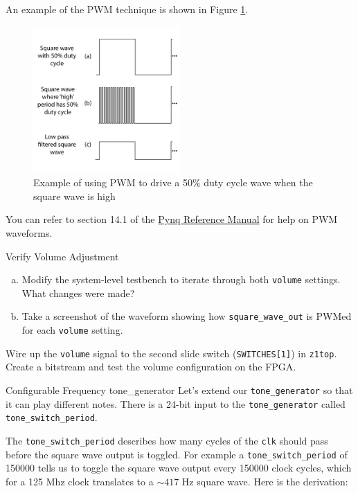 \documentclass[11pt]{article}
\makeatletter
\renewcommand{\subsection}
{\@startsection {subsection}{1}{0pt}
 {-1ex}
 {0.5ex}
 {\bfseries\normalsize}}
\makeatother
\begin{document}
An example of the PWM technique is shown in Figure \ref{fig:pwm}.

\begin{figure}[h]
  \centering
  \includegraphics[width=0.5\textwidth]{figs/pwm.pdf}
  \caption{Example of using PWM to drive a 50\% duty cycle wave when the square wave is high}
  \label{fig:pwm}
\end{figure}

You can refer to section 14.1 of the \href{https://reference.digilentinc.com/reference/programmable-logic/pynq-z1/reference-manual}{Pynq Reference Manual} for help on PWM waveforms.

\begin{texexptitled}{Verify Volume Adjustment}{}
  \begin{enumerate}[a)]
    \item Modify the system-level testbench to iterate through both \verb|volume| settings. What changes were made?
    \item Take a screenshot of the waveform showing how \verb|square_wave_out| is PWMed for each \verb|volume| setting.
  \end{enumerate}
\end{texexptitled}

Wire up the \verb|volume| signal to the second slide switch (\verb|SWITCHES[1]|) in \verb|z1top|.
Create a bitstream and test the volume configuration on the FPGA.

\subsection{Configurable Frequency tone\_generator}
Let's extend our \verb|tone_generator| so that it can play different notes.
There is a 24-bit input to the \verb|tone_generator| called \verb|tone_switch_period|.

The \verb|tone_switch_period| describes how many cycles of the \verb|clk| should pass before the square wave output is toggled.
For example a \verb|tone_switch_period| of 150000 tells us to toggle the square wave output every 150000 clock cycles, which for a 125 Mhz clock translates to a $\sim 417$ Hz square wave. Here is the derivation:
\end{document}
